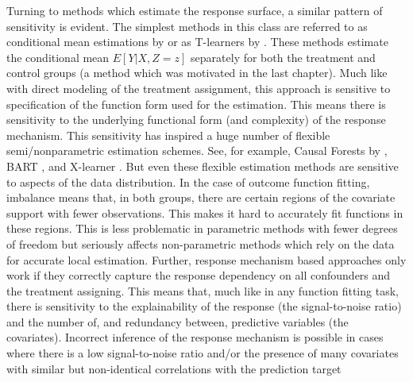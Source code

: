 \documentclass[../main.tex]{subfiles}
\begin{document}
\vspace{\baselineskip}
Turning to methods which estimate the response surface, a similar pattern of sensitivity is evident. The simplest methods in this class are referred to as conditional mean estimations by \cite{Knaus2018MachineEvidence} or as T-learners by \cite{Kunzel2019MetalearnersLearning}. These methods estimate the conditional mean  \( E \left[ Y \vert  X, Z=z \right]  \)  separately for both the treatment and control groups (a method which was motivated in the last chapter). Much like with direct modeling of the treatment assignment, this approach is sensitive to specification of the function form used for the estimation. This means there is sensitivity to the underlying functional form (and complexity) of the response mechanism. This sensitivity has inspired a huge number of flexible semi/nonparametric estimation schemes. See, for example, Causal Forests by \cite{Athey2018ApproximateDimensions}, BART \cite{Hill2011BayesianInference}, and X-learner \cite{Kunzel2019MetalearnersLearning}. But even these flexible estimation methods are sensitive to aspects of the data distribution. In the case of outcome function fitting, imbalance means that, in both groups, there are certain regions of the covariate support with fewer observations. This makes it hard to accurately fit functions in these regions. This is less problematic in parametric methods with fewer degrees of freedom but seriously affects non-parametric methods which rely on the data for accurate local estimation. Further, response mechanism based approaches only work if they correctly capture the response dependency on all confounders and the treatment assigning. This means that, much like in any function fitting task, there is sensitivity to the explainability of the response (the signal-to-noise ratio) and the number of, and redundancy between, predictive variables (the covariates). Incorrect inference of the response mechanism is possible in cases where there is a low signal-to-noise ratio and/or the presence of many covariates with similar but non-identical correlations with the prediction target\par
\end{document}
